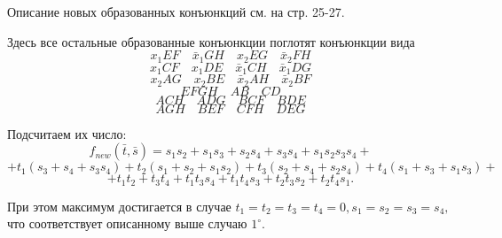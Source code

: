 \documentclass[12pt,a4paper,oneside,fleqn,leqno]{article}
\theoremstyle{definition}
\begin{document}
			Описание новых образованных конъюнкций см. на стр. 25-27.\par
			Здесь все остальные образованные конъюнкции поглотят конъюнкции вида
			$$
				x_1EF\quad \bar{x}_1GH\quad  x_2EG\quad  \bar{x}_2FH
			$$
			$$
				x_1CF\quad  x_1DE\quad 
				\bar{x}_1CH\quad  \bar{x}_1DG$$ $$
				x_2AG\quad  x_2BE\quad 
				\bar{x}_2AH\quad  \bar{x}_2BF
			$$
			$$
				EFGH\quad  AB\quad  CD$$
			$$
				ACH\quad  ADG\quad  BCF\quad  BDE
			$$
			$$
				AGH\quad  BEF\quad  CFH\quad  DEG
			$$\par
			Подсчитаем их число:
			$$
				f_{new}(\bar{t}, \bar{s}) = s_1s_2 + s_1s_3 + s_2s_4 + s_3s_4 + s_1s_2s_3s_4 +
			$$
			$$ 
				+ t_1(s_3 + s_4 + s_3s_4) + t_2(s_1 + s_2 + s_1s_2) + t_3(s_2 + s_4 + s_2s_4) + t_4(s_1 + s_3 + s_1s_3) + 
			$$
			$$
				+ t_1t_2 + t_3t_4 + t_1t_3s_4 + t_1t_4s_3 + t_2t_3s_2 + t_2t_4s_1.
			$$\par
			При этом максимум достигается в случае $t_1 = t_2 = t_3 = t_4 = 0, s_1=s_2=s_3=s_4,$ что соответствует описанному выше случаю $1^{\circ}.$
		\newpage
\end{document}
